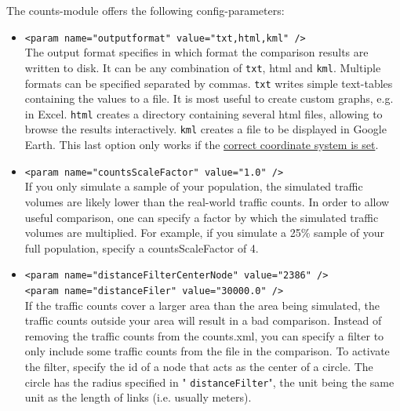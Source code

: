 The counts-module offers the following config-parameters:
\begin{itemize}
	\item 
\texttt{<param name="outputformat" value="txt,html,kml" />}
\\     The output format specifies in which format the comparison results are written to disk. It can be any combination of 
\texttt{txt}, html and 
\texttt{kml}. Multiple formats can be specified separated by commas. 
\texttt{txt} writes simple text-tables containing the values to a file. It is most useful to create custom graphs, e.g. in Excel. 
\texttt{html} creates a directory containing several html files, allowing to browse the results interactively. 
\texttt{kml} creates a file to be displayed in Google Earth. This last option only works if the \href{http://www.matsim.org/node/405}{correct coordinate system is set}.
	\item 
\texttt{<param name="countsScaleFactor" value="1.0" />}
\\     If you only simulate a sample of your population, the simulated  traffic volumes are likely lower than the real-world traffic counts. In  order to allow useful comparison, one can specify a factor by which the  simulated traffic volumes are multiplied. For example, if you simulate a  25\% sample of your full population, specify a countsScaleFactor  of 4.
	\item 
\texttt{<param name="distanceFilterCenterNode" value="2386" />
\\     <param name="distanceFiler" value="30000.0" />}
\\     If the traffic counts cover a larger area than the area being  simulated, the traffic counts outside your area will result in a bad  comparison. Instead of removing the traffic counts from the counts.xml,  you can specify a filter to only include some traffic counts from the  file in the comparison. To activate the filter, specify the id of a node  that acts as the center of a circle. The circle has the radius  specified in "
\texttt{distanceFilter}", the unit being the same unit as the length of links (i.e. usually meters).
\end{itemize}



\vfill\eject

